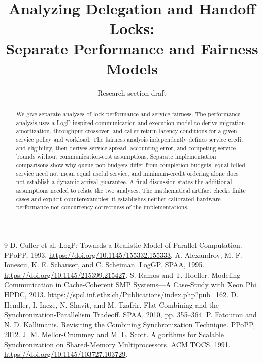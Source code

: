 \documentclass[10pt,twocolumn]{article}
\title{Analyzing Delegation and Handoff Locks:\\Separate Performance and Fairness Models}
\author{Research section draft}
\date{}
\begin{document}
\maketitle
\begin{abstract}
We give separate analyses of lock performance and service fairness.
The performance analysis uses a LogP-inspired communication and execution
model to derive migration amortization, throughput crossover, and
caller-return latency conditions for a given service policy and workload.
The fairness analysis independently defines service credit and eligibility,
then derives service-spread, accounting-error, and competing-service bounds
without communication-cost assumptions. Separate implementation comparisons
show why queue-pop budgets differ from completion budgets, equal billed
service need not mean equal useful service, and minimum-credit ordering
alone does not establish a dynamic-arrival guarantee. A final discussion
states the additional assumptions needed to relate the two analyses.
The mathematical artifact checks finite cases and explicit counterexamples;
it establishes neither calibrated hardware performance nor concurrency
correctness of the implementations.
\end{abstract}

\begin{thebibliography}{9}
 D. Culler et al. LogP: Towards a Realistic Model of Parallel Computation. PPoPP, 1993. \url{https://doi.org/10.1145/155332.155333}.
 A. Alexandrov, M. F. Ionescu, K. E. Schauser, and C. Scheiman. LogGP. SPAA, 1995. \url{https://doi.org/10.1145/215399.215427}.
 S. Ramos and T. Hoefler. Modeling Communication in Cache-Coherent SMP Systems---A Case-Study with Xeon Phi. HPDC, 2013. \url{https://spcl.inf.ethz.ch/Publications/index.php?pub=162}.
 D. Hendler, I. Incze, N. Shavit, and M. Tzafrir. Flat Combining and the Synchronization-Parallelism Tradeoff. SPAA, 2010, pp. 355--364.
 P. Fatourou and N. D. Kallimanis. Revisiting the Combining Synchronization Technique. PPoPP, 2012.
 J. M. Mellor-Crummey and M. L. Scott. Algorithms for Scalable Synchronization on Shared-Memory Multiprocessors. ACM TOCS, 1991. \url{https://doi.org/10.1145/103727.103729}.
\end{thebibliography}
\clearpage
\nobalance
\onecolumn
\appendix

\end{document}
